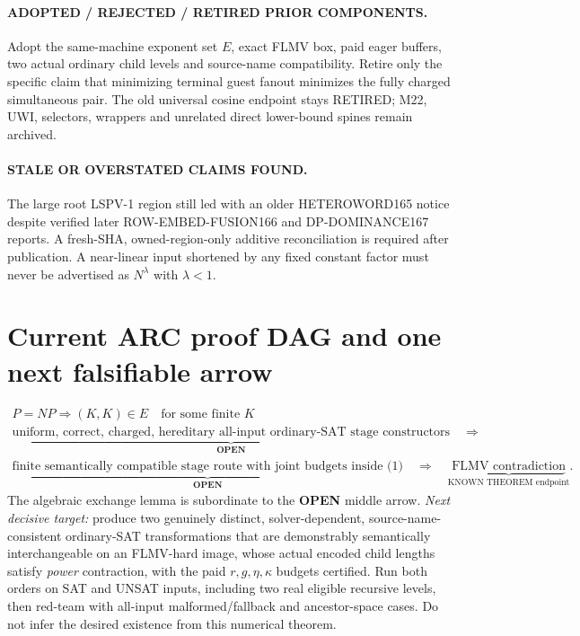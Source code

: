 \documentclass[11pt]{article}
\newcommand{\OPEN}{\textbf{OPEN}}
\begin{document}
\paragraph{ADOPTED / REJECTED / RETIRED PRIOR COMPONENTS.}
Adopt the same-machine exponent set $E$, exact FLMV box, paid eager
buffers, two actual ordinary child levels and source-name compatibility.
Retire only the specific claim that minimizing terminal guest fanout
minimizes the fully charged simultaneous pair. The old universal
cosine endpoint stays RETIRED; M22, UWI, selectors, wrappers and
unrelated direct lower-bound spines remain archived.

\paragraph{STALE OR OVERSTATED CLAIMS FOUND.}
The large root LSPV-1 region still led with an older HETEROWORD165
notice despite verified later ROW-EMBED-FUSION166 and DP-DOMINANCE167
reports. A fresh-SHA, owned-region-only additive reconciliation is
required after publication. A near-linear input shortened by any fixed
constant factor must never be advertised as $N^{\lambda}$ with
$\lambda<1$.

\section{Current ARC proof DAG and one next falsifiable arrow}
\[
\begin{gathered}
P=NP \Longrightarrow (K,K)\in E\quad\text{for some finite }K\\
\underbrace{\text{uniform, correct, charged, hereditary
all-input ordinary-SAT stage constructors}}_{\OPEN}\quad\Longrightarrow\\
\underbrace{\text{finite semantically compatible stage route with
joint budgets inside (1)}}_{\OPEN}\quad\Longrightarrow\quad
\underbrace{\text{FLMV contradiction}}_{\text{KNOWN THEOREM endpoint}}.
\end{gathered}
\]
The algebraic exchange lemma is subordinate to the \OPEN{} middle arrow.
\emph{Next decisive target:} produce two genuinely distinct,
solver-dependent, source-name-consistent ordinary-SAT transformations that
are demonstrably semantically interchangeable on an FLMV-hard image,
whose actual encoded child lengths satisfy \emph{power} contraction,
with the paid $r,g,\eta,\kappa$ budgets certified. Run both orders on
SAT and UNSAT inputs, including two real eligible recursive levels,
then red-team with all-input malformed/fallback and ancestor-space cases.
Do not infer the desired existence from this numerical theorem.
\end{document}
